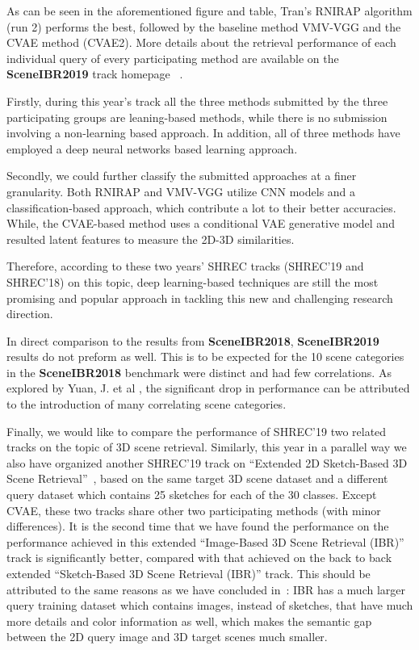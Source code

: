 \documentclass[../main.tex]{subfiles}
\begin{document}
As can be seen in the aforementioned figure and table, Tran's RNIRAP algorithm (run 2) performs the best, followed by the baseline method VMV-VGG and the CVAE method (CVAE2). More details about the retrieval performance of each individual query of every participating method are available on the \textbf{SceneIBR2019} track homepage~\cite{SceneIBR19} . 

Firstly, during this year's track all the three methods submitted by the three participating groups are leaning-based methods, while there is no submission involving a non-learning based approach. In addition, all of three methods have employed a deep neural networks based learning approach. 

Secondly, we could further classify the submitted approaches at a finer granularity. Both RNIRAP and VMV-VGG utilize CNN models and a classification-based approach, which contribute a lot to their better accuracies. While, the CVAE-based method uses a conditional VAE generative model and resulted latent features to measure the 2D-3D similarities. 

Therefore, according to these two years' SHREC tracks (SHREC'19 and SHREC'18) on this topic, deep learning-based techniques are still the most promising and popular approach in tackling this new and challenging research direction.

In direct comparison to the results from \textbf{SceneIBR2018}, \textbf{SceneIBR2019} results do not preform as well. This is to be expected for the 10 scene categories in the \textbf{SceneIBR2018} benchmark were distinct and had few correlations. As explored by Yuan, J. et al \cite{MIPR}, the significant drop in performance can be attributed to the introduction of many correlating scene categories. 


Finally, we would like to compare the performance of SHREC'19 two related tracks on the topic of 3D scene retrieval. Similarly, this year in a parallel way we also have organized another SHREC'19 track on ``Extended 2D Sketch-Based 3D Scene Retrieval''~\cite{SceneIBR19}, based on the same target 3D scene dataset and a different query dataset which contains 25 sketches for each of the 30 classes. Except CVAE, these two tracks share other two participating methods (with minor differences). It is the second time that we have found the performance on the performance achieved in this extended ``Image-Based 3D Scene Retrieval (IBR)'' track is significantly better, compared with that achieved on the back to back extended ``Sketch-Based 3D Scene Retrieval (IBR)'' track. This should be attributed to the same reasons as we have concluded in~\cite{SceneIBR19}: IBR has a much larger query training dataset which contains images, instead of sketches, that have much more details and color information as well, which makes the semantic gap between the 2D query image and 3D target scenes much smaller.  
\end{document}
